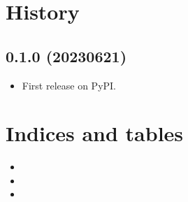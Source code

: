 \documentclass[letterpaper,10pt,english]{sphinxmanual}
\begin{document}
\sphinxstepscope


\chapter{History}
\label{\detokenize{history:history}}\label{\detokenize{history::doc}}

\section{0.1.0 (2023\sphinxhyphen{}06\sphinxhyphen{}21)}
\label{\detokenize{history:id1}}\begin{itemize}
\item {} 
\sphinxAtStartPar
First release on PyPI.

\end{itemize}


\chapter{Indices and tables}
\label{\detokenize{index:indices-and-tables}}\begin{itemize}
\item {} 
\sphinxAtStartPar
{}

\item {} 
\sphinxAtStartPar
{}

\item {} 
\sphinxAtStartPar
{}

\end{itemize}
\end{document}

